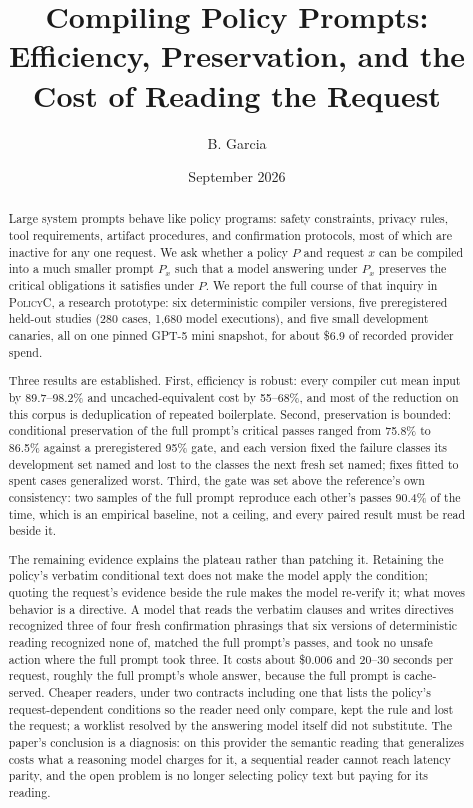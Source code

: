 \documentclass[11pt]{article}
\title{Compiling Policy Prompts:\\Efficiency, Preservation, and the Cost of Reading the Request}
\author{B. Garcia}
\date{September 2026}
\newcommand{\policyc}{\textsc{PolicyC}\xspace}
\newcommand{\px}{P_x}
\begin{document}
\maketitle

\begin{abstract}
Large system prompts behave like policy programs: safety constraints, privacy rules, tool requirements, artifact procedures, and confirmation protocols, most of which are inactive for any one request. We ask whether a policy $P$ and request $x$ can be compiled into a much smaller prompt $\px$ such that a model answering under $\px$ preserves the critical obligations it satisfies under $P$. We report the full course of that inquiry in \policyc, a research prototype: six deterministic compiler versions, five preregistered held-out studies (280 cases, 1{,}680 model executions), and five small development canaries, all on one pinned GPT-5 mini snapshot, for about \$6.9 of recorded provider spend.

Three results are established. First, efficiency is robust: every compiler cut mean input by 89.7--98.2\% and uncached-equivalent cost by 55--68\%, and most of the reduction on this corpus is deduplication of repeated boilerplate. Second, preservation is bounded: conditional preservation of the full prompt's critical passes ranged from 75.8\% to 86.5\% against a preregistered 95\% gate, and each version fixed the failure classes its development set named and lost to the classes the next fresh set named; fixes fitted to spent cases generalized worst. Third, the gate was set above the reference's own consistency: two samples of the full prompt reproduce each other's passes 90.4\% of the time, which is an empirical baseline, not a ceiling, and every paired result must be read beside it.

The remaining evidence explains the plateau rather than patching it. Retaining the policy's verbatim conditional text does not make the model apply the condition; quoting the request's evidence beside the rule makes the model re-verify it; what moves behavior is a directive. A model that reads the verbatim clauses and writes directives recognized three of four fresh confirmation phrasings that six versions of deterministic reading recognized none of, matched the full prompt's passes, and took no unsafe action where the full prompt took three. It costs about \$0.006 and 20--30 seconds per request, roughly the full prompt's whole answer, because the full prompt is cache-served. Cheaper readers, under two contracts including one that lists the policy's request-dependent conditions so the reader need only compare, kept the rule and lost the request; a worklist resolved by the answering model itself did not substitute. The paper's conclusion is a diagnosis: on this provider the semantic reading that generalizes costs what a reasoning model charges for it, a sequential reader cannot reach latency parity, and the open problem is no longer selecting policy text but paying for its reading.
\end{abstract}
\end{document}
